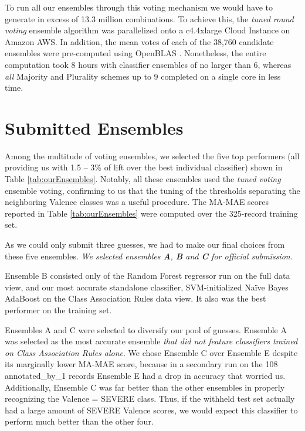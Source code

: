 To run all our ensembles through this voting mechanism we would have to generate
in excess of 13.3 million combinations. To achieve this,  the \textit{tuned round voting}
ensemble algorithm was parallelized onto a \textsf{c4.4xlarge} Cloud Instance on Amazon AWS. In addition, the mean votes of each of the 38,760 candidate ensembles were pre-computed using OpenBLAS \cite{open-blas}. Nonetheless, the entire computation took 8 hours with classifier ensembles of no larger than 6, whereas \textit{all}  Majority and Plurality schemes up to 9 completed on a single core in less time. %

\section{Submitted Ensembles}

Among the multitude of voting ensembles, we selected the five top performers (all
providing us with 1.5 -- 3\% of lift over the best individual
classifier) shown in Table \ref{tab:ourEnsembles}. Notably,
all these ensembles used the \textit{tuned voting} ensemble voting, confirming to us that the tuning of the thresholds
separating the neighboring \textsf{Valence} classes was a
useful procedure. The \textsf{MA-MAE} scores
reported in Table \ref{tab:ourEnsembles} were computed
over the 325-record training set.

As we could only submit three guesses, we had to make our final
choices from these five ensembles. 
\textit{
We selected ensembles \textbf{A}, \textbf{B} and \textbf{C} for official submission.}

\textsf{Ensemble B} consisted only of the Random Forest regressor
run on the full data view, and our most accurate standalone
classifier, SVM-initialized Na\"{i}ve Bayes AdaBoost on the Class Association
Rules data view. It also was the best performer on the training set.

\textsf{Ensembles A} and \textsf{C} were selected to diversify our 
pool of guesses. \textsf{Ensemble A} was
selected as the most accurate ensemble \textit{that did
not feature classifiers trained on Class Association Rules alone}.
We chose \textsf{Ensemble C} over \textsf{Ensemble E} despite its marginally lower MA-MAE score, because
in a secondary run on the 108 \textsf{annotated\_by\_1} records
\textsf{Ensemble E} had a drop in accuracy that worried us.
Additionally, \textsf{Ensemble C} was far better than the other
ensembles in properly recognizing the \textsf{Valence = SEVERE} class. Thus, if the withheld test set actually had a large amount of \textsf{SEVERE} Valence scores, we would expect this classifier to perform much better than the other four. 




